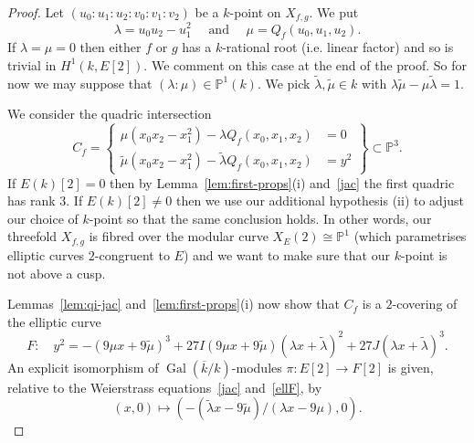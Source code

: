 \documentclass[12pt]{amsart}
\newcommand{\Gal}{{\operatorname{Gal}}}
\newcommand{\PP}{{\mathbb P}}
\newcommand{\kbar}{{\overline k}}
\newcommand{\isom}{\cong}
\theoremstyle{definition}
\begin{document}
\begin{proof}
  Let $(u_0:u_1:u_2:v_0:v_1:v_2)$ be a $k$-point on $X_{f,g}$. We put
  \begin{equation}
    \label{def:lamu}
  \lambda = u_0 u_2 - u_1^2 \quad \text{ and } \quad
    \mu = Q_f(u_0,u_1,u_2).
  \end{equation}
  If $\lambda = \mu = 0$ then either $f$ or $g$ has a $k$-rational
  root (i.e. linear factor) and so is trivial in $H^1(k,E[2])$. We
  comment on this case at the end of the proof. So for now we may
  suppose that
  $(\lambda :\mu) \in \PP^1(k)$. We pick
  $\widetilde{\lambda}, \widetilde{\mu} \in k$ with
  $\lambda \widetilde{\mu} - \mu \widetilde{\lambda} = 1$.

  We consider the quadric intersection
  \[ C_f = \left\{ \begin{aligned} \mu (x_0x_2 - x_1^2) - \lambda
        Q_f(x_0,x_1,x_2) &= 0 \\ \widetilde{\mu} (x_0x_2 - x_1^2) -
        \widetilde{\lambda} Q_f(x_0,x_1,x_2) &= y^2 \end{aligned}
    \right\} \subset \PP^3. \] If $E(k)[2]=0$ then by
  Lemma~\ref{lem:first-props}(i) and~\eqref{jac}
  the first quadric has rank $3$. If
  $E(k)[2] \not= 0$ then we use our additional hypothesis (ii) to
  adjust our choice of $k$-point so that the same conclusion holds.
  In other words, our threefold $X_{f,g}$ is fibred over the modular
  curve $X_E(2) \isom \PP^1$ (which parametrises elliptic curves
  $2$-congruent to $E$) and we want to make sure that our $k$-point is
  not above a cusp.
  
  Lemmas~\ref{lem:qi-jac} and~\ref{lem:first-props}(i) now show that
  $C_f$ is a $2$-covering of the elliptic curve
  \begin{equation}
    \label{ellF}
    F : \quad y^2 = -(9\mu x + 9 \widetilde{\mu})^3
    + 27 I (9\mu x + 9 \widetilde{\mu}) (\lambda x + \widetilde{\lambda})^2
    + 27 J  (\lambda x + \widetilde{\lambda})^3.
  \end{equation}
  An explicit isomorphism of $\Gal(\kbar/k)$-modules
  $\pi : E[2] \to F[2]$ is given, relative to the Weierstrass
  equations~\eqref{jac} and~\eqref{ellF}, by
 \begin{equation}
   \label{pi}
   (x,0) \mapsto (-(\widetilde{\lambda} x - 9
   \widetilde{\mu})/(\lambda x - 9 \mu),0).
  \end{equation}
 

\end{proof}
\end{document}
